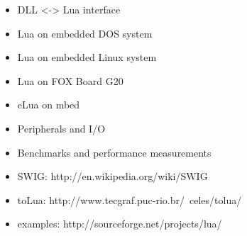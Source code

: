 \begin{itemize}
	\item DLL <-> Lua interface
	\item Lua on embedded DOS system
	\item Lua on embedded Linux system
	\item Lua on FOX Board G20
	\item eLua on mbed
	\item Peripherals and I/O
	\item Benchmarks and performance measurements
	\item SWIG: http://en.wikipedia.org/wiki/SWIG
	\item toLua: http://www.tecgraf.puc-rio.br/~celes/tolua/
	\item examples: http://sourceforge.net/projects/lua/
\end{itemize}
